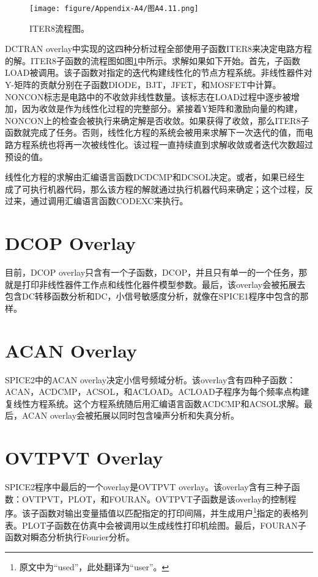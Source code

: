 \begin{figure}[htbp]
\small
    \centering
    \texttt{[image: figure/Appendix-A4/图A4.11.png]}
    \caption{ITER8流程图。}
    \label{图A4.11}
\end{figure}

DCTRAN overlay中实现的这四种分析过程全部使用子函数ITER8来决定电路方程的解。ITER8子函数的流程图如图\ref{图A4.11}中所示。求解如果如下开始。首先，子函数LOAD被调用。该子函数对指定的迭代构建线性化的节点方程系统。非线性器件对Y-矩阵的贡献分别在子函数DIODE，BJT，JFET，和MOSFET中计算。NONCON标志是电路中的不收敛非线性数量。该标志在LOAD过程中逐步被增加，因为收敛是作为线性化过程的完整部分。紧接着Y矩阵和激励向量的构建，NONCON上的检查会被执行来确定解是否收敛。如果获得了收敛，那么ITER8子函数就完成了任务。否则，线性化方程的系统会被用来求解下一次迭代的值，而电路方程系统也将再一次被线性化。该过程一直持续直到求解收敛或者迭代次数超过预设的值。

线性化方程的求解由汇编语言函数DCDCMP和DCSOL决定。或者，如果已经生成了可执行机器代码，那么该方程的解就通过执行机器代码来确定；这个过程，反过来，通过调用汇编语言函数CODEXC来执行。

\section{DCOP Overlay}
目前，DCOP overlay只含有一个子函数，DCOP，并且只有单一的一个任务，那就是打印非线性器件工作点和线性化器件模型参数。最后，该overlay会被拓展去包含DC转移函数分析和DC，小信号敏感度分析，就像在SPICE1程序中包含的那样。

\section{ACAN Overlay}
SPICE2中的ACAN overlay决定小信号频域分析。该overlay含有四种子函数：ACAN，ACDCMP，ACSOL，和ACLOAD。ACLOAD子程序为每个频率点构建复线性方程系统。这个方程系统随后用汇编语言函数ACDCMP和ACSOL求解。最后，ACAN overlay会被拓展以同时包含噪声分析和失真分析。

\section{OVTPVT Overlay}
SPICE2程序中最后的一个overlay是OVTPVT overlay。该overlay含有三种子函数：OVTPVT，PLOT，和FOURAN。OVTPVT子函数是该overlay的控制程序。该子函数对输出变量插值以匹配指定的打印间隔，并生成用户\footnote{原文中为“used”，此处翻译为“user”。}指定的表格列表。PLOT子函数在仿真中会被调用以生成线性打印机绘图。最后，FOURAN子函数对瞬态分析执行Fourier分析。

